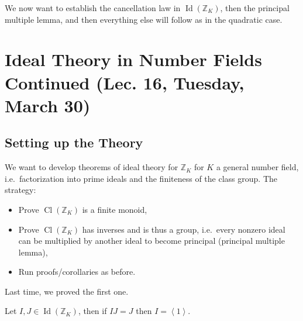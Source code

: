 \begin{remark}

We now want to establish the cancellation law in
\(\operatorname{Id}({\mathbb{Z}}_K)\), then the principal multiple
lemma, and then everything else will follow as in the quadratic case.

\end{remark}

\hypertarget{ideal-theory-in-number-fields-continued-lec.-16-tuesday-march-30}{%
\section{Ideal Theory in Number Fields Continued (Lec. 16, Tuesday,
March
30)}\label{ideal-theory-in-number-fields-continued-lec.-16-tuesday-march-30}}

\hypertarget{setting-up-the-theory}{%
\subsection{Setting up the Theory}\label{setting-up-the-theory}}

\begin{remark}

We want to develop theorems of ideal theory for \({\mathbb{Z}}_K\) for
\(K\) a general number field, i.e.~factorization into prime ideals and
the finiteness of the class group. The strategy:

\begin{itemize}
\tightlist
\item
  Prove \({ \operatorname{Cl}} ({\mathbb{Z}}_K)\) is a finite monoid,
\item
  Prove \({ \operatorname{Cl}} ({\mathbb{Z}}_K)\) has inverses and is
  thus a group, i.e.~every nonzero ideal can be multiplied by another
  ideal to become principal (principal multiple lemma),
\item
  Run proofs/corollaries as before.
\end{itemize}

Last time, we proved the first one.

\end{remark}

\begin{lemma}

Let \(I, J \in \operatorname{Id}({\mathbb{Z}}_K)\), then if \(IJ = J\)
then \(I = \left\langle{ 1 }\right\rangle\).

\end{lemma}

